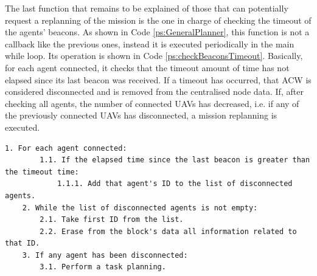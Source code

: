 \documentclass[fontsize=11pt, English=false, Español=true, Myfinal=true, twoside, numbers=noenddot]{scrbook}
\begin{document}
{The last function that remains to be explained of those that can potentially request a replanning of the mission is the one in charge of checking the timeout of the agents' beacons. As shown in  Code \ref{ps:GeneralPlanner}, this function is not a callback like the previous ones, instead it is executed periodically in the main while loop. Its operation is shown in Code \ref{ps:checkBeaconsTimeout}. Basically, for each agent connected, it checks that the timeout amount of time has not elapsed since its last beacon was received. If a timeout has occurred, that \gls{ACW} is considered disconnected and is removed from the centralised node data. If, after checking all agents, the number of connected \glspl{UAV} has decreased, i.e. if any of the previously connected \glspl{UAV} has disconnected, a mission replanning is executed.

\begin{lstlisting}[caption={Beacons' timeout check function}, breaklines=true, label=ps:checkBeaconsTimeout]
	1. For each agent connected:
		1.1. If the elapsed time since the last beacon is greater than the timeout time:
			1.1.1. Add that agent's ID to the list of disconnected agents.
	2. While the list of disconnected agents is not empty:
		2.1. Take first ID from the list.
		2.2. Erase from the block's data all information related to that ID.
	3. If any agent has been disconnected:
		3.1. Perform a task planning.
\end{lstlisting}

}
\end{document}
